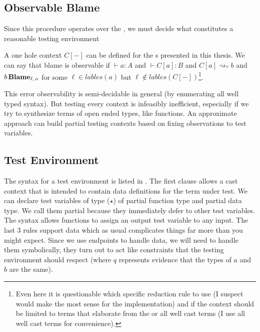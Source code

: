 \subsection{Observable Blame}
Since this procedure operates over the \clang{}, we must decide what constitutes a reasonable testing environment
 
A one hole context $C[-]$ can be defined for the \clang{}s presented in this thesis.
We can say that blame is observable if $\vdash a:A$ and $\vdash C[a]:B$ and $C[a]\rightsquigarrow_{*}b$ and $b\,\textbf{Blame}{}_{\ell, \,o}$ for some $\ell \in lables\left(a\right)$ but $\ell \notin lables\left(C[-]\right)$\footnote{
 Even here it is questionable which specific reduction rule to use (I suspect \cbv{} would make the most sense for the implementation) and if the context should be limited to terms that elaborate from the \slang{} or all well cast terms (I use all well cast terms for convenience).
}.
 
This error observability is semi-decidable in general (by enumerating all well typed syntax).
But testing every context is infeasibly inefficient, especially if we try to synthesize terms of open ended types, like functions.
An approximate approach can build partial testing contexts based on fixing observations to test variables.
 
 
\subsection{Test Environment}
The syntax for a test environment is listed in .
The first clause allows a cast context that is intended to contain data definitions for the term under test.
We can declare test variables of type ($\star$) of partial function type and partial data type.
We call them partial because they immediately defer to other test variables.
The syntax allows functions to assign an output test variable to any input.
The last 3 rules support data which as usual complicates things far more than you might expect.
Since we use endpoints to handle data, we will need to handle them symbolically, they turn out to act like constraints that the testing environment should respect (where $q$ represents evidence that the types of $a$ and $b$ are the same).

